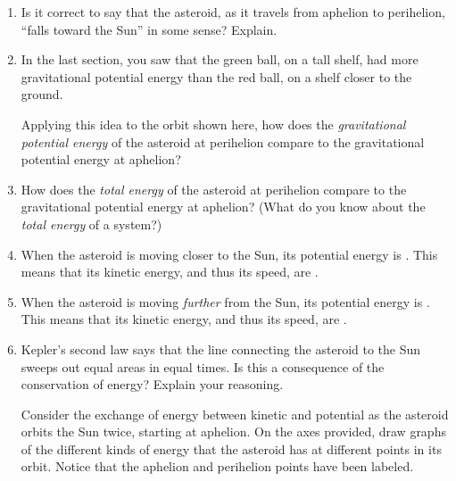 \documentclass[12pt]{article}
\begin{document}
\begin{enumerate}

\item Is it correct to say that the asteroid, as it travels from aphelion to
perihelion, ``falls toward the Sun'' in some sense? Explain.

\vspace{1in}

\item In the last section, you saw that the green ball, on a tall shelf, had more gravitational potential
energy than the red ball, on a shelf closer to the ground.

Applying this idea to the orbit shown here, how does the {\it gravitational potential energy} of the asteroid
at perihelion compare to the gravitational potential energy at aphelion?

\vspace{1in}

\item How does the {\it total energy} of the asteroid
at perihelion compare to the gravitational potential energy at aphelion? (What do you know about the {\it total energy} of a system?)

\vspace{1in}

\item When the asteroid is moving closer to the Sun, its potential energy is \underline{\hspace{1in}}.
This means that its kinetic energy, and thus its speed, are \underline{\hspace{1in}}.

\item When the asteroid is moving {\it further} from the Sun, its potential energy is \underline{\hspace{1in}}.
This means that its kinetic energy, and thus its speed, are \underline{\hspace{1in}}.

\vspace{0.5in}

\item Kepler's second law says that the line connecting the asteroid to the Sun sweeps out equal areas in equal 
times. Is this a consequence of the conservation of energy? Explain your reasoning.



Consider the exchange of energy between kinetic and potential as the asteroid orbits
the Sun twice, starting at aphelion. On the axes provided, draw graphs of the 
different kinds of energy that the asteroid has at different points in its orbit.
Notice that the aphelion and perihelion points have been labeled.
\begin{center}


\end{center}
\end{enumerate}
\end{document}
